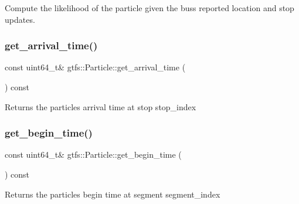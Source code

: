 Compute the likelihood of the particle given the bus\textquotesingle{}s reported location and stop updates. \mbox{\label{classgtfs_1_1Particle_a783d1a0a614dc2c3f18cf269f69ede3d}} 
\subsubsection{\texorpdfstring{get\+\_\+arrival\+\_\+time()}{get\_arrival\_time()}}
{\footnotesize\ttfamily const uint64\+\_\+t\& gtfs\+::\+Particle\+::get\+\_\+arrival\+\_\+time (\begin{DoxyParamCaption}{ }\end{DoxyParamCaption}) const\hspace{0.3cm}{\ttfamily [inline]}}

\begin{DoxyReturn}{Returns}
the particle\textquotesingle{}s arrival time at stop {\ttfamily stop\+\_\+index} 
\end{DoxyReturn}
\mbox{\label{classgtfs_1_1Particle_ac4c8fd3566b0178c95daf6a0cba0040e}} 
\subsubsection{\texorpdfstring{get\+\_\+begin\+\_\+time()}{get\_begin\_time()}}
{\footnotesize\ttfamily const uint64\+\_\+t\& gtfs\+::\+Particle\+::get\+\_\+begin\+\_\+time (\begin{DoxyParamCaption}{ }\end{DoxyParamCaption}) const\hspace{0.3cm}{\ttfamily [inline]}}

\begin{DoxyReturn}{Returns}
the particle\textquotesingle{}s begin time at segment {\ttfamily segment\+\_\+index} 
\end{DoxyReturn}
\mbox{\label{classgtfs_1_1Particle_a0ec3ee5a83e778069946242a6d7731b6}} 
